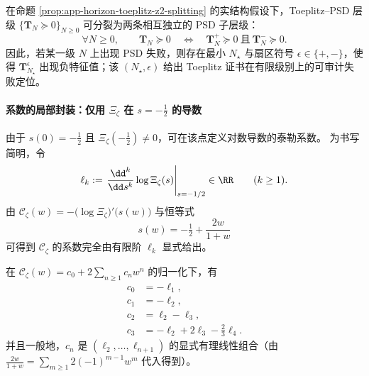\begin{corollary}\label{cor:app-horizon-toeplitz-z2-cert-split}
在命题 \ref{prop:app-horizon-toeplitz-z2-splitting} 的实结构假设下，Toeplitz--PSD 层级
\(\{\mathbf{T}_N\succeq 0\}_{N\ge 0}\)
可分裂为两条相互独立的 PSD 子层级：
\[
\forall N\ge 0,\qquad
\mathbf{T}_N\succeq 0
\quad\Longleftrightarrow\quad
\mathbf{T}_N^{+}\succeq 0\ \text{且}\ \mathbf{T}_N^{-}\succeq 0.
\]
因此，若某一级 \(N\) 上出现 PSD 失败，则存在最小 \(N_\star\) 与扇区符号 \(\epsilon\in\{+,-\}\)，使得 \(\mathbf{T}_{N_\star}^{\epsilon}\) 出现负特征值；该 \((N_\star,\epsilon)\) 给出 Toeplitz 证书在有限级别上的可审计失败定位。
\end{corollary}

\paragraph{系数的局部封装：仅用 \texorpdfstring{$\Xi_{\zeta}$}{Xi_zeta} 在 \texorpdfstring{$s=-\tfrac12$}{s=-1/2} 的导数}
由于 \(s(0)=-\tfrac12\) 且 \(\Xi_{\zeta}(-\tfrac12)\neq 0\)，可在该点定义对数导数的泰勒系数。
为书写简明，令
\[
\ell_k:=\left.\frac{\dd^k}{\dd s^k}\log\Xi_{\zeta}(s)\right|_{s=-1/2}\in\RR
\qquad(k\ge 1).
\]
由 \(\mathscr{C}_{\zeta}(w)=-\bigl(\log\Xi_{\zeta}\bigr)'\!\bigl(s(w)\bigr)\) 与恒等式
\begin{equation}\label{eq:app-horizon-s-of-w-shift}
s(w)=-\tfrac12+\frac{2w}{1+w}
\end{equation}
可得到 \(\mathscr{C}_{\zeta}\) 的系数完全由有限阶 \(\ell_k\) 显式给出。

\begin{proposition}[前几阶系数的显式表达]\label{prop:app-horizon-coeff-local}
在 \(\mathscr{C}_{\zeta}(w)=c_0+2\sum_{n\ge 1}c_n w^n\) 的归一化下，有
\begin{equation}\label{eq:app-horizon-c0c3}
\begin{aligned}
c_0&=-\ell_1,\\
c_1&=-\ell_2,\\
c_2&=\ell_2-\ell_3,\\
c_3&=-\ell_2+2\ell_3-\tfrac23\ell_4.
\end{aligned}
\end{equation}
并且一般地，\(c_n\) 是 \((\ell_2,\dots,\ell_{n+1})\) 的显式有理线性组合（由 \(\frac{2w}{1+w}=\sum_{m\ge 1}2(-1)^{m-1}w^m\) 代入得到）。
\end{proposition}

